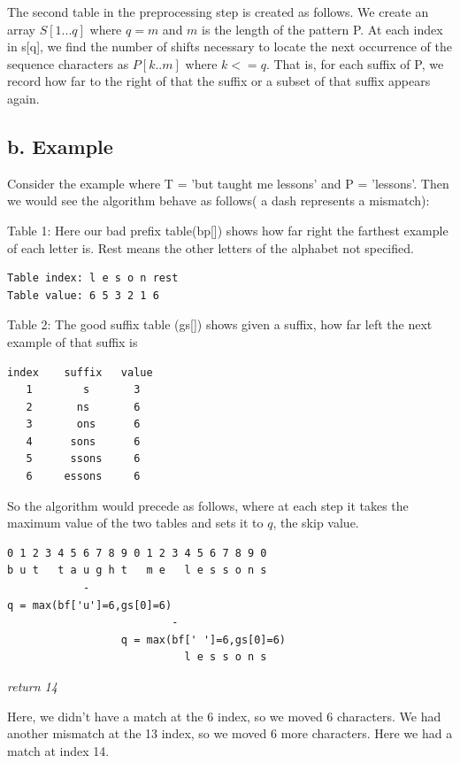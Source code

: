 \documentclass{chi2005}
\begin{document}
The second table in the preprocessing step is created as follows. We create an array $S[1...q]$ where $q=m$ and $m$ is the length of the pattern P. At each index in s[q], we find the number of shifts necessary to locate the next occurrence of the sequence characters as $P[k..m]$ where $k<=q$. That is, for each suffix of P, we record how far to the right of that the suffix or a subset of that suffix appears again.

\subsection{b. Example}

Consider the example where T = 'but taught me lessons' and P = 'lessons'. Then we would see the algorithm behave as follows( a dash represents a mismatch):

Table 1:
Here our bad prefix table(bp[]) shows how far right the farthest example of each letter is. Rest means the other letters of the alphabet not specified.

\begin{verbatim}
Table index: l e s o n rest
Table value: 6 5 3 2 1 6
\end{verbatim}

Table 2: 
The good suffix table (gs[]) shows given a suffix, how far left the next example of that suffix is

\begin{verbatim}
index    suffix   value
   1        s       3
   2       ns       6
   3       ons      6
   4      sons      6
   5      ssons     6
   6     essons     6
\end{verbatim}

So the algorithm would precede as follows, where at each step it takes the maximum value of the two tables and sets it to $q$, the skip value.

\begin{verbatim}
0 1 2 3 4 5 6 7 8 9 0 1 2 3 4 5 6 7 8 9 0
b u t   t a u g h t   m e   l e s s o n s
            -
q = max(bf['u']=6,gs[0]=6)
                          -    
                  q = max(bf[' ']=6,gs[0]=6)
                            l e s s o n s                         
\end{verbatim}

\emph{return 14}

Here, we didn't have a match at the 6 index, so we moved 6 characters. We had another mismatch at the 13 index, so we moved 6 more characters. Here we had a match at index 14. 
\end{document}
